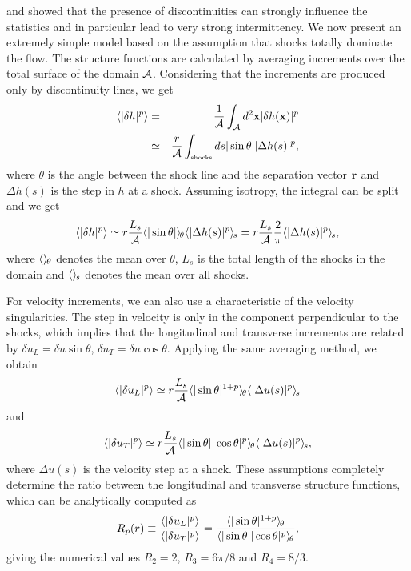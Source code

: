 \cite{BouchaudMezardParisi1995} and \cite{Kuznetsov2004} showed that
the presence of discontinuities can strongly influence the statistics
and in particular lead to very strong intermittency.
%
We now present an extremely simple model based on the assumption that
shocks totally dominate the flow.  The structure functions are
calculated by averaging increments over the total surface of the
domain $\mathcal{A}$.  Considering that the increments are produced only by
discontinuity lines, we get
\begin{eqnarray}
\meane{|\delta h|^p} 
&=& \frac{1}{\mA} \int_{\mA}  d^2\xx |\delta h(\xx)|^p \nonumber\\
&\simeq& \frac{r}{\mA} \int_\shocks ds |\sin\theta| |\Delta h (s)|^p,
\end{eqnarray}
where $\theta$ is the angle between the shock line and the separation
vector $\textbf{r}$ %
and $\Delta h (s)$ is the step in $h$ at a shock.
%
Assuming isotropy, the integral can be split and we get
\begin{equation}
\langle |\delta h|^p \rangle 
\simeq 
r \frac{L_s}{\mathcal{A}} {\langle |\sin\theta| \rangle_{\hspace{-0.4mm}\theta}} {\langle |\Delta h (s)|^p \rangle_{\hspace{-0.4mm}s}}
=
r \frac{L_s}{\mathcal{A}} \frac{2}{\pi} {\langle |\Delta h (s)|^p \rangle_{\hspace{-0.4mm}s}},
\end{equation}
where ${\langle  \rangle_{\hspace{-0.4mm}\theta}}$ denotes the mean over $\theta$, %
$L_s$ is the total length of the shocks in the domain %
and ${\langle  \rangle_{\hspace{-0.4mm}s}}$ denotes the mean over all shocks.

For velocity increments, we can also use a characteristic of the
velocity singularities.  The step in velocity is only in the component
perpendicular to the shocks, which implies that the longitudinal and
transverse increments are related by $\delta u_L = \delta u
\sin\theta$, $\delta u_T = \delta u \cos\theta$.
%
Applying the same averaging method, we obtain
\begin{equation}
\langle |\delta u_L|^p \rangle 
\simeq 
r \frac{L_s}{\mathcal{A}} 
{\langle |\sin\theta|^{1+p} \rangle_{\hspace{-0.4mm}\theta}}
{\langle |\Delta u (s)|^p \rangle_{\hspace{-0.4mm}s}}
\end{equation}
and
\begin{equation}
\langle |\delta u_T|^p \rangle 
\simeq 
r \frac{L_s}{\mathcal{A}} 
{\langle |\sin\theta||\cos\theta|^{p} \rangle_{\hspace{-0.4mm}\theta}}
{\langle |\Delta u (s)|^p \rangle_{\hspace{-0.4mm}s}},
\end{equation}
where $\Delta u (s)$ is the velocity step at a shock.
%
These assumptions completely determine the ratio between the
longitudinal and transverse structure functions, which can be
analytically computed as
\begin{eqnarray}
R_p(r) \equiv \frac{\langle |\delta u_L|^p \rangle}{\langle |\delta u_T|^p \rangle} = 
\frac{{\langle |\sin\theta|^{1+p} \rangle_{\hspace{-0.4mm}\theta}}}{{\langle |\sin\theta||\cos\theta|^p \rangle_{\hspace{-0.4mm}\theta}}},
\end{eqnarray}
giving the numerical values $R_2 = 2$, $R_3 = 6\pi/8$ and $R_4 = 8/3$.


